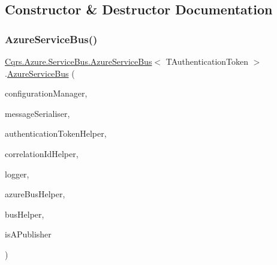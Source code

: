 \subsection{Constructor \& Destructor Documentation}
\mbox{\label{classCqrs_1_1Azure_1_1ServiceBus_1_1AzureServiceBus_a44845c00c29574c2fa2d43a8a6b124ca_a44845c00c29574c2fa2d43a8a6b124ca}} 
\subsubsection{\texorpdfstring{Azure\+Service\+Bus()}{AzureServiceBus()}}
{\footnotesize\ttfamily \hyperlink{classCqrs_1_1Azure_1_1ServiceBus_1_1AzureServiceBus}{Cqrs.\+Azure.\+Service\+Bus.\+Azure\+Service\+Bus}$<$ T\+Authentication\+Token $>$.\hyperlink{classCqrs_1_1Azure_1_1ServiceBus_1_1AzureServiceBus}{Azure\+Service\+Bus} (\begin{DoxyParamCaption}\item[{\hyperlink{interfaceCqrs_1_1Configuration_1_1IConfigurationManager}{I\+Configuration\+Manager}}]{configuration\+Manager,  }\item[{\hyperlink{interfaceCqrs_1_1Azure_1_1ServiceBus_1_1IMessageSerialiser}{I\+Message\+Serialiser}$<$ T\+Authentication\+Token $>$}]{message\+Serialiser,  }\item[{\hyperlink{interfaceCqrs_1_1Authentication_1_1IAuthenticationTokenHelper}{I\+Authentication\+Token\+Helper}$<$ T\+Authentication\+Token $>$}]{authentication\+Token\+Helper,  }\item[{I\+Correlation\+Id\+Helper}]{correlation\+Id\+Helper,  }\item[{I\+Logger}]{logger,  }\item[{\hyperlink{interfaceCqrs_1_1Azure_1_1ServiceBus_1_1IAzureBusHelper}{I\+Azure\+Bus\+Helper}$<$ T\+Authentication\+Token $>$}]{azure\+Bus\+Helper,  }\item[{\hyperlink{interfaceCqrs_1_1Bus_1_1IBusHelper}{I\+Bus\+Helper}}]{bus\+Helper,  }\item[{bool}]{is\+A\+Publisher }\end{DoxyParamCaption})\hspace{0.3cm}{\ttfamily [protected]}}



